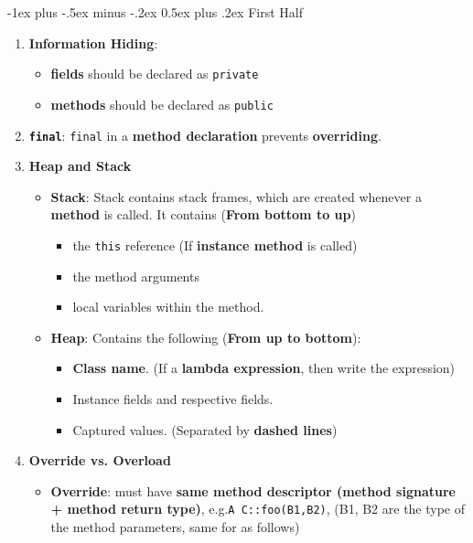 \documentclass[10pt, landscape]{article}
\makeatletter
\renewcommand{\section}{\@startsection{section}{1}{0mm}%
                                {-1ex plus -.5ex minus -.2ex}%
                                {0.5ex plus .2ex}%
                                {\normalfont\large\bfseries}}
\makeatother
\begin{document}
\begin{multicols}{4}
\section{First Half}
\begin{enumerate}
    \item \textbf{Information Hiding}:
    \begin{itemize}
        \item \textbf{fields} should be declared as \texttt{private}
        \item \textbf{methods} should be declared as \texttt{public}
    \end{itemize}
    \item \textbf{\texttt{final}}: \texttt{final} in a \textbf{method declaration} prevents \textbf{overriding}.
    \item \textbf{Heap and Stack}
    \begin{itemize}
        \item \textbf{Stack}: Stack contains stack frames, which are created whenever a \textbf{method} is called. It contains (\textbf{From bottom to up})
        \begin{itemize}
            \item the \texttt{this} reference (If \textbf{instance method} is called)
            \item the method arguments
            \item local variables within the method.
        \end{itemize}
        \item \textbf{Heap}: Contains the following (\textbf{From up to bottom}):
        \begin{itemize}
            \item \textbf{Class name}. (If a \textbf{lambda expression}, then write the expression)
            \item Instance fields and respective fields.
            \item Captured values. (Separated by \textbf{dashed lines})
        \end{itemize}
    \end{itemize}
    \item \textbf{Override vs. Overload}
    \begin{itemize}
        \item \textbf{Override}: must have \textbf{same method descriptor (method signature + method return type)}, e.g.\texttt{A C::foo(B1,B2)}, (B1, B2 are the type of the method parameters, same for as follows)

\end{itemize}
\end{enumerate}
\end{multicols}
\end{document}
